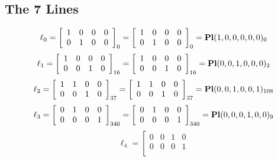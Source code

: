 \documentclass{article}
\begin{document}
{\subsection*{The 7 Lines}
$$
\ell_{0} = 
\left[
\begin{array}{*{4}{r}}
1 & 0 & 0 & 0\\
0 & 1 & 0 & 0\\
\end{array}
\right]
_{0}
=
\left[
\begin{array}{*{4}c}
1  & 0  & 0  & 0\\
0  & 1  & 0  & 0\\
\end{array}
\right]_{0}
={\rm\bf Pl}(1,0,0,0,0,0 )_{0}$$
$$
\ell_{1} = 
\left[
\begin{array}{*{4}{r}}
1 & 0 & 0 & 0\\
0 & 0 & 1 & 0\\
\end{array}
\right]
_{16}
=
\left[
\begin{array}{*{4}c}
1  & 0  & 0  & 0\\
0  & 0  & 1  & 0\\
\end{array}
\right]_{16}
={\rm\bf Pl}(0,0,1,0,0,0 )_{2}$$
$$
\ell_{2} = 
\left[
\begin{array}{*{4}{r}}
1 & 1 & 0 & 0\\
0 & 0 & 1 & 0\\
\end{array}
\right]
_{37}
=
\left[
\begin{array}{*{4}c}
1  & 1  & 0  & 0\\
0  & 0  & 1  & 0\\
\end{array}
\right]_{37}
={\rm\bf Pl}(0,0,1,0,0,1 )_{108}$$
$$
\ell_{3} = 
\left[
\begin{array}{*{4}{r}}
0 & 1 & 0 & 0\\
0 & 0 & 0 & 1\\
\end{array}
\right]
_{340}
=
\left[
\begin{array}{*{4}c}
0  & 1  & 0  & 0\\
0  & 0  & 0  & 1\\
\end{array}
\right]_{340}
={\rm\bf Pl}(0,0,0,1,0,0 )_{9}$$
$$
\ell_{4} = 
\left[
\begin{array}{*{4}{r}}
0 & 0 & 1 & 0\\
0 & 0 & 0 & 1\\
\end{array}
$$}
\end{document}
